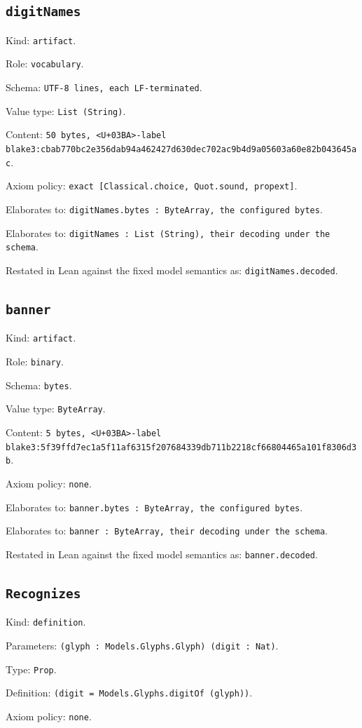\documentclass[11pt]{article}
\begin{document}
\subsection*{\texttt{digitNames}}
\noindent Kind: \texttt{artifact}.\par
\noindent Role: \texttt{vocabulary}.\par
\noindent Schema: \texttt{UTF-8 lines, each LF-terminated}.\par
\noindent Value type: \texttt{List (String)}.\par
\noindent Content: \texttt{50 bytes, <U+03BA>-label blake3:cbab770bc2e356dab94a462427d630dec702ac9b4d9a05603a60e82b043645ac}.\par
\noindent Axiom policy: \texttt{exact [Classical.choice, Quot.sound, propext]}.\par
\noindent Elaborates to: \texttt{digitNames.bytes : ByteArray, the configured bytes}.\par
\noindent Elaborates to: \texttt{digitNames : List (String), their decoding under the schema}.\par
\noindent Restated in Lean against the fixed model semantics as: \texttt{digitNames.decoded}.\par
\subsection*{\texttt{banner}}
\noindent Kind: \texttt{artifact}.\par
\noindent Role: \texttt{binary}.\par
\noindent Schema: \texttt{bytes}.\par
\noindent Value type: \texttt{ByteArray}.\par
\noindent Content: \texttt{5 bytes, <U+03BA>-label blake3:5f39ffd7ec1a5f11af6315f207684339db711b2218cf66804465a101f8306d3b}.\par
\noindent Axiom policy: \texttt{none}.\par
\noindent Elaborates to: \texttt{banner.bytes : ByteArray, the configured bytes}.\par
\noindent Elaborates to: \texttt{banner : ByteArray, their decoding under the schema}.\par
\noindent Restated in Lean against the fixed model semantics as: \texttt{banner.decoded}.\par
\subsection*{\texttt{Recognizes}}
\noindent Kind: \texttt{definition}.\par
\noindent Parameters: \texttt{(glyph : Models.Glyphs.Glyph) (digit : Nat)}.\par
\noindent Type: \texttt{Prop}.\par
\noindent Definition: \texttt{(digit = Models.Glyphs.digitOf (glyph))}.\par
\noindent Axiom policy: \texttt{none}.\par
\end{document}
